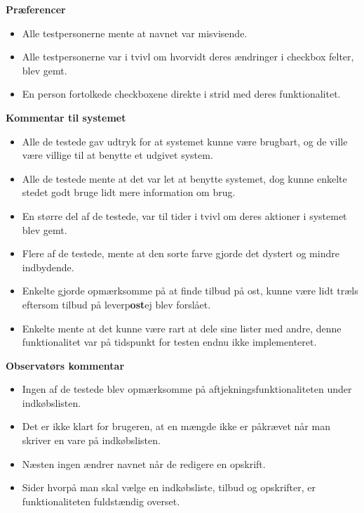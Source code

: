 \textbf{Præferencer} 
\begin{itemize}
   \item Alle testpersonerne mente at navnet var misvisende.
   \item Alle testpersonerne var i tvivl om hvorvidt deres ændringer i checkbox felter, blev gemt.
   \item En person fortolkede checkboxene direkte i strid med deres funktionalitet.
\end{itemize}

\textbf{Kommentar til systemet} 
\begin{itemize}
   \item Alle de testede gav udtryk for at systemet kunne være brugbart, og de ville være villige til at benytte et udgivet system.
   \item Alle de testede mente at det var let at benytte systemet, dog kunne enkelte stedet godt bruge lidt mere information om brug.
   \item En større del af de testede, var til tider i tvivl om deres aktioner i systemet blev gemt.
   \item Flere af de testede, mente at den sorte farve gjorde det dystert og mindre indbydende.
   \item Enkelte gjorde opmærksomme på at finde tilbud på ost, kunne være lidt træls eftersom tilbud på leverp\textbf{ost}ej blev forslået.
   \item Enkelte mente at det kunne være rart at dele sine lister med andre, denne funktionalitet var på tidspunkt for testen endnu ikke implementeret.
\end{itemize}

\textbf{Observatørs kommentar} 
\begin{itemize}
   \item Ingen af de testede blev opmærksomme på aftjekningsfunktionaliteten under indkøbslisten.
   \item Det er ikke klart for brugeren, at en mængde ikke er påkrævet når man skriver en vare på indkøbslisten.
   \item Næsten ingen ændrer navnet når de redigere en opskrift.
   \item Sider hvorpå man skal vælge en indkøbsliste, tilbud og opskrifter, er funktionaliteten fuldstændig overset.
\end{itemize}